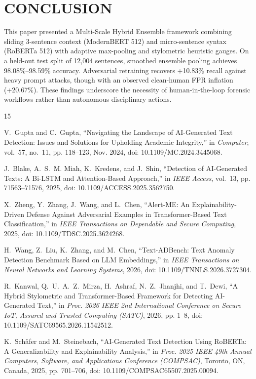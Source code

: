 \documentclass[conference]{IEEEtran}
\begin{document}
\section{CONCLUSION}
This paper presented a Multi-Scale Hybrid Ensemble framework combining sliding 3-sentence context (ModernBERT 512) and micro-sentence syntax (RoBERTa 512) with adaptive max-pooling and stylometric heuristic gauges. On a held-out test split of 12,004 sentences, smoothed ensemble pooling achieves 98.08\%--98.59\% accuracy. Adversarial retraining recovers +10.83\% recall against heavy prompt attacks, though with an observed clean-human FPR inflation (+20.67\%). These findings underscore the necessity of human-in-the-loop forensic workflows rather than autonomous disciplinary actions.

\begin{thebibliography}{15}

V.~Gupta and C.~Gupta, ``Navigating the Landscape of AI-Generated Text Detection: Issues and Solutions for Upholding Academic Integrity,'' in \emph{Computer}, vol.~57, no.~11, pp. 118--123, Nov. 2024, doi: 10.1109/MC.2024.3445068.

J.~Blake, A.~S.~M. Miah, K.~Kredens, and J.~Shin, ``Detection of AI-Generated Texts: A Bi-LSTM and Attention-Based Approach,'' in \emph{IEEE Access}, vol.~13, pp. 71563--71576, 2025, doi: 10.1109/ACCESS.2025.3562750.

X.~Zheng, Y.~Zhang, J.~Wang, and L.~Chen, ``Alert-ME: An Explainability-Driven Defense Against Adversarial Examples in Transformer-Based Text Classification,'' in \emph{IEEE Transactions on Dependable and Secure Computing}, 2025, doi: 10.1109/TDSC.2025.3624268.

H.~Wang, Z.~Liu, K.~Zhang, and M.~Chen, ``Text-ADBench: Text Anomaly Detection Benchmark Based on LLM Embeddings,'' in \emph{IEEE Transactions on Neural Networks and Learning Systems}, 2026, doi: 10.1109/TNNLS.2026.3727304.

R.~Kanwal, Q.~U.~A.~Z.~Mirza, H.~Ashraf, N.~Z.~Jhanjhi, and T.~Dewi, ``A Hybrid Stylometric and Transformer-Based Framework for Detecting AI-Generated Text,'' in \emph{Proc. 2026 IEEE 2nd International Conference on Secure IoT, Assured and Trusted Computing (SATC)}, 2026, pp. 1--8, doi: 10.1109/SATC69565.2026.11542512.

K.~Sch\"{a}fer and M.~Steinebach, ``AI-Generated Text Detection Using RoBERTa: A Generalizability and Explainability Analysis,'' in \emph{Proc. 2025 IEEE 49th Annual Computers, Software, and Applications Conference (COMPSAC)}, Toronto, ON, Canada, 2025, pp. 701--706, doi: 10.1109/COMPSAC65507.2025.00094.


\end{thebibliography}
\end{document}
